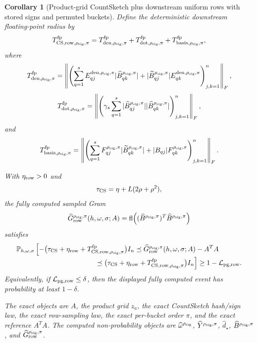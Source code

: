 \documentclass[11pt]{article}
\newcommand{\Prob}{\mathbb{P}}
\newcommand{\Frob}[1]{\left\lVert #1\right\rVert_F}
\newcommand{\fl}{\operatorname{fl}}
\newcommand{\I}{I}
\newtheorem{corollary}[theorem]{Corollary}
\theoremstyle{remark}
\begin{document}
\begin{corollary}[Product-grid CountSketch plus downstream uniform rows with stored signs and permuted buckets]
Define the deterministic downstream floating-point radius by
\[
  T_{{\rm CS,row},\rho_{\rm sig},\pi}^{\rm fp}
  =
  T_{{\rm den},\rho_{\rm sig},\pi}^{\rm fp}
  +
  T_{{\rm dot},\rho_{\rm sig},\pi}^{\rm fp}
  +
  T_{{\rm basis},\rho_{\rm sig},\pi}^{\rm fp},
\]
where
\[
  T_{{\rm den},\rho_{\rm sig},\pi}^{\rm fp}
  =
  \Frob{
    \left(
      \sum_{q=1}^{s}
      E^{{\rm den},\rho_{\rm sig},\pi}_{qj}
        |\widehat B^{\rho_{\rm sig},\pi}_{qk}|
      +
      |\widetilde B^{\rho_{\rm sig},\pi}_{qj}|
        E^{{\rm den},\rho_{\rm sig},\pi}_{qk}
    \right)_{j,k=1}^{n}
  },
\]
\[
  T_{{\rm dot},\rho_{\rm sig},\pi}^{\rm fp}
  =
  \Frob{
    \left(
      \gamma_s\sum_{q=1}^{s}
      |\widehat B^{\rho_{\rm sig},\pi}_{qj}|
      |\widehat B^{\rho_{\rm sig},\pi}_{qk}|
    \right)_{j,k=1}^{n}
  },
\]
and
\[
  T_{{\rm basis},\rho_{\rm sig},\pi}^{\rm fp}
  =
  \Frob{
    \left(
      \sum_{q=1}^{s}
      F^{\rho_{\rm sig},\pi}_{qj}
        |\widetilde B^{\rho_{\rm sig},\pi}_{qk}|
      +
      |B_{qj}|F^{\rho_{\rm sig},\pi}_{qk}
    \right)_{j,k=1}^{n}
  }.
\]

With \(\eta_{\rm row}>0\) and
\[
  \tau_{\rm CS}=\eta+L(2\rho+\rho^2),
\]
the fully computed sampled Gram
\[
  \widehat G_{\rm row}^{\rho_{\rm sig},\pi}(h,\omega,\sigma;A)
  =
  \fl\!\left(
    (\widehat B^{\rho_{\rm sig},\pi})^T
    \widehat B^{\rho_{\rm sig},\pi}
  \right)
\]
satisfies
\[
\begin{aligned}
&\Prob_{h,\omega,\sigma}
  \left[
    -\bigl(\tau_{\rm CS}+\eta_{\rm row}
      +T_{{\rm CS,row},\rho_{\rm sig},\pi}^{\rm fp}\bigr)\I_n
    \preceq
    \widehat G_{\rm row}^{\rho_{\rm sig},\pi}(h,\omega,\sigma;A)-A^TA
  \right.
\\[-2pt]
&\left.\hspace{4.0cm}
    \preceq
    \bigl(\tau_{\rm CS}+\eta_{\rm row}
      +T_{{\rm CS,row},\rho_{\rm sig},\pi}^{\rm fp}\bigr)\I_n
  \right]
  \ge
  1-\mathcal L_{\rm pg,row}.
\end{aligned}
\]
Equivalently, if \(\mathcal L_{\rm pg,row}\le\delta\), then the displayed
fully computed event has probability at least \(1-\delta\).

The exact objects are \(A\), the product grid \(z_a\), the exact CountSketch
hash/sign law, the exact row-sampling law, the exact per-bucket order
\(\pi\), and the exact reference \(A^TA\).  The computed non-probability
objects are \(\widehat\omega^{\rho_{\rm sig}}\),
\(\widehat Y^{\rho_{\rm sig},\pi}\), \(\widehat d_\star\),
\(\widehat B^{\rho_{\rm sig},\pi}\), and
\(\widehat G_{\rm row}^{\rho_{\rm sig},\pi}\).


\end{corollary}
\end{document}
